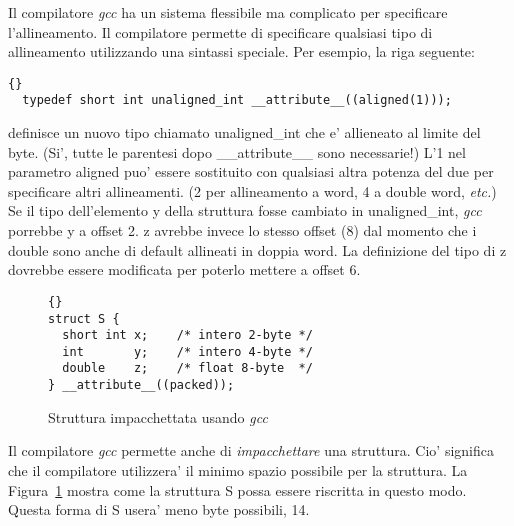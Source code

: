 
Il compilatore \emph{gcc} ha un 
sistema flessibile ma complicato per specificare l'allineamento. Il
compilatore permette di specificare qualsiasi tipo di allineamento 
utilizzando una sintassi speciale. Per esempio, la riga seguente:
\begin{lstlisting}[stepnumber=0]{}
  typedef short int unaligned_int __attribute__((aligned(1)));
\end{lstlisting}
\noindent definisce un nuovo tipo chiamato {\code unaligned\_int} 
che e' allieneato al limite del byte. (Si', tutte le parentesi dopo
{\code \_\_attribute\_\_} sono necessarie!) L'1 nel parametro
{\code aligned} puo' essere sostituito con qualsiasi altra potenza
del due per specificare altri allineamenti. (2 per allineamento a word,
4 a double word, \emph{etc.}) Se il tipo dell'elemento {\code y} 
della struttura fosse cambiato in {\code unaligned\_int}, \emph{gcc}
porrebbe {\code y} a offset 2. {\code z} avrebbe invece lo stesso offset
(8) dal momento che i double sono anche di default allineati in doppia
word. La definizione del tipo di {\code z} dovrebbe essere modificata
per poterlo mettere a offset 6. 

\begin{figure}[t]
\begin{lstlisting}[frame=tlrb,stepnumber=0]{}
struct S {
  short int x;    /* intero 2-byte */
  int       y;    /* intero 4-byte */
  double    z;    /* float 8-byte  */
} __attribute__((packed));
\end{lstlisting}
\caption{Struttura impacchettata usando \emph{gcc} \label{fig:packedStruct}}
\end{figure}

Il compilatore \emph{gcc} permette anche di \emph{impacchettare} una 
struttura. Cio' significa che il compilatore utilizzera' il minimo
spazio possibile per la struttura. La Figura~\ref{fig:packedStruct} mostra
come la struttura {\code S} possa essere riscritta in questo modo.
Questa forma di {\code S} usera' meno byte possibili, 14.

